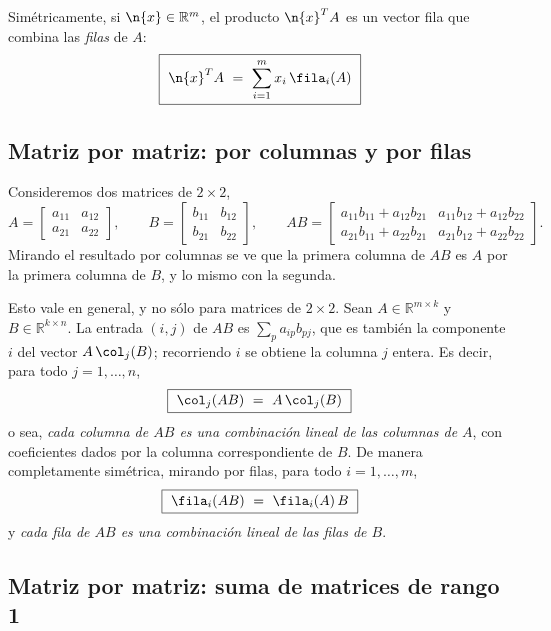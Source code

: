 Simétricamente, si $\n{x}\in\mathbb{R}^m$, el producto $\n{x}^TA$ es un vector
fila que combina las \emph{filas} de $A$:
\begin{equation}
\boxed{\ \n{x}^TA \ =\ \sum_{i=1}^m x_i \, \fila_i(A) \ }
\label{eq:vec-mat-fila}
\end{equation}

\subsection{Matriz por matriz: por columnas y por filas}\label{sec:producto-filas-cols}

Consideremos dos matrices de $2 \times 2$,
\[
A = \begin{bmatrix} a_{11} & a_{12} \\ a_{21} & a_{22} \end{bmatrix},
\qquad
B = \begin{bmatrix} b_{11} & b_{12} \\ b_{21} & b_{22} \end{bmatrix},
\qquad
AB = \begin{bmatrix}
a_{11}b_{11}+a_{12}b_{21} & a_{11}b_{12}+a_{12}b_{22} \\
a_{21}b_{11}+a_{22}b_{21} & a_{21}b_{12}+a_{22}b_{22}
\end{bmatrix}.
\]
Mirando el resultado por columnas se ve que la primera columna de $AB$ es $A$
por la primera columna de $B$, y lo mismo con la segunda.

Esto vale en general, y no sólo para matrices de $2\times2$. Sean
$A\in\mathbb{R}^{m\times k}$ y $B\in\mathbb{R}^{k\times n}$. La entrada $(i,j)$
de $AB$ es $\sum_p a_{ip}b_{pj}$, que es también la componente $i$ del vector
$A\,\col_j(B)$; recorriendo $i$ se obtiene la columna $j$ entera. Es decir,
para todo $j=1,\dots,n$,
\begin{equation}
\boxed{\ \col_j (AB) \ =\ A \,\col_j(B)\ }
\label{eq:cols}
\end{equation}
o sea, \emph{cada columna de $AB$ es una combinación lineal de las columnas de
$A$}, con coeficientes dados por la columna correspondiente de $B$. De manera
completamente simétrica, mirando por filas, para todo $i=1,\dots,m$,
\begin{equation}
\boxed{\ \fila_i(AB) \ =\ \fila_i(A) \, B\ }
\label{eq:filas}
\end{equation}
y \emph{cada fila de $AB$ es una combinación lineal de las filas de $B$}.

\subsection{Matriz por matriz: suma de matrices de rango 1}

